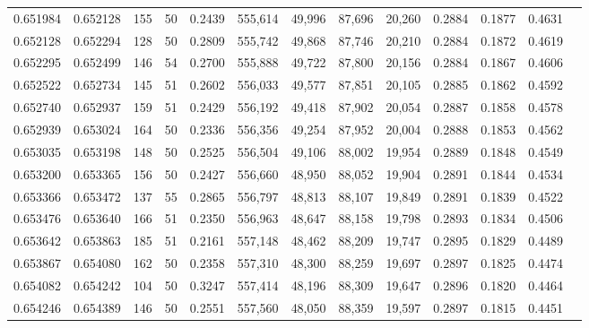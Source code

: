 \begin{tabular}{rrrrrrrrrrrrr}
0.651984 & 0.652128 &   155 &  50 &                                     0.2439 & 555,614 &  49,996 &  87,696 &  20,260 & 0.2884 & 0.1877 & 0.4631 \\
0.652128 & 0.652294 &   128 &  50 &                                     0.2809 & 555,742 &  49,868 &  87,746 &  20,210 & 0.2884 & 0.1872 & 0.4619 \\
0.652295 & 0.652499 &   146 &  54 &                                     0.2700 & 555,888 &  49,722 &  87,800 &  20,156 & 0.2884 & 0.1867 & 0.4606 \\
0.652522 & 0.652734 &   145 &  51 &                                     0.2602 & 556,033 &  49,577 &  87,851 &  20,105 & 0.2885 & 0.1862 & 0.4592 \\
0.652740 & 0.652937 &   159 &  51 &                                     0.2429 & 556,192 &  49,418 &  87,902 &  20,054 & 0.2887 & 0.1858 & 0.4578 \\
0.652939 & 0.653024 &   164 &  50 &                                     0.2336 & 556,356 &  49,254 &  87,952 &  20,004 & 0.2888 & 0.1853 & 0.4562 \\
0.653035 & 0.653198 &   148 &  50 &                                     0.2525 & 556,504 &  49,106 &  88,002 &  19,954 & 0.2889 & 0.1848 & 0.4549 \\
0.653200 & 0.653365 &   156 &  50 &                                     0.2427 & 556,660 &  48,950 &  88,052 &  19,904 & 0.2891 & 0.1844 & 0.4534 \\
0.653366 & 0.653472 &   137 &  55 &                                     0.2865 & 556,797 &  48,813 &  88,107 &  19,849 & 0.2891 & 0.1839 & 0.4522 \\
0.653476 & 0.653640 &   166 &  51 &                                     0.2350 & 556,963 &  48,647 &  88,158 &  19,798 & 0.2893 & 0.1834 & 0.4506 \\
0.653642 & 0.653863 &   185 &  51 &                                     0.2161 & 557,148 &  48,462 &  88,209 &  19,747 & 0.2895 & 0.1829 & 0.4489 \\
0.653867 & 0.654080 &   162 &  50 &                                     0.2358 & 557,310 &  48,300 &  88,259 &  19,697 & 0.2897 & 0.1825 & 0.4474 \\
0.654082 & 0.654242 &   104 &  50 &                                     0.3247 & 557,414 &  48,196 &  88,309 &  19,647 & 0.2896 & 0.1820 & 0.4464 \\
0.654246 & 0.654389 &   146 &  50 &                                     0.2551 & 557,560 &  48,050 &  88,359 &  19,597 & 0.2897 & 0.1815 & 0.4451 \\

\end{tabular}
